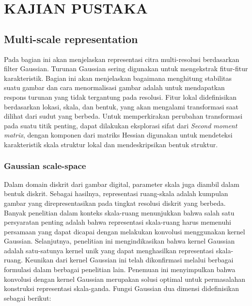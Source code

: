
\chapter{KAJIAN PUSTAKA}

\section{Multi-scale representation}

Pada bagian ini akan menjelaskan representasi citra multi-resolusi berdasarkan filter Gaussian. 
Turunan Gaussian sering digunakan untuk mengekstrak fitur-fitur karakteristik. Bagian ini akan menjelaskan bagaimana menghitung stabilitas 
suatu gambar dan cara menormalisasi gambar adalah untuk mendapatkan respons turunan yang tidak tergantung pada resolusi. 
Fitur lokal didefinisikan berdasarkan lokasi, skala, dan bentuk, yang akan mengalami transformasi saat dilihat dari sudut yang berbeda. 
Untuk memperkirakan perubahan transformasi pada suatu titik penting, dapat dilakukan eksplorasi sifat dari \emph{Second moment matrix}, 
dengan komponen dari matriks Hessian digunakan untuk mendeteksi karakteristik skala struktur lokal dan mendeskripsikan bentuk struktur.

\subsection{Gaussian scale-space}

Dalam domain diskrit dari gambar digital, parameter skala juga diambil dalam bentuk diskrit. 
Sebagai hasilnya, representasi ruang-skala adalah kumpulan gambar yang direpresentasikan pada tingkat resolusi diskrit yang berbeda. 
Banyak penelitian dalam konteks skala-ruang menunjukkan bahwa salah satu persyaratan penting adalah bahwa representasi skala-ruang harus memenuhi persamaan yang dapat dicapai dengan melakukan konvolusi menggunakan kernel Gaussian. 
Selanjutnya, penelitian ini mengindikasikan bahwa kernel Gaussian adalah satu-satunya kernel unik yang dapat menghasilkan representasi skala-ruang. 
Keunikan dari kernel Gaussian ini telah dikonfirmasi melalui berbagai formulasi dalam berbagai penelitian lain. 
Penemuan ini menyimpulkan bahwa konvolusi dengan kernel Gaussian merupakan solusi optimal untuk permasalahan konstruksi representasi skala-ganda. 
Fungsi Gaussian dua dimensi didefinisikan sebagai berikut:

